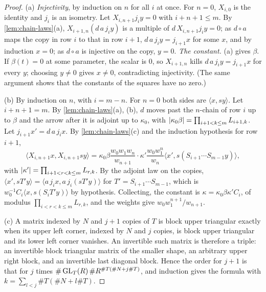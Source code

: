 \begin{proof}
(a) \emph{Injectivity}, by induction on $n$ for all $i$ at once. For $n=0$, $X_{i,0}$ is the identity and $j_i$ is an isometry. Let $X_{i,n+1}j_iy=0$ with $i+n+1\le m$. By \cref{lem:chain-laws}(a),
$X_{i+1,n}(d\,a\,j_iy)$ is a multiple of $d\,X_{i,n+1}j_iy=0$; as $d\circ a$ maps the copy in row $i$ to that in row $i+1$, $d\,a\,j_iy=j_{i+1}x$ for some $x$, and by induction $x=0$; as $d\circ a$ is injective on the copy,
$y=0$. \emph{The constant.} (a) gives $\beta$. If $\beta(t)=0$ at some parameter, the scalar is $0$, so $X_{i+1,n}$ kills $d\,a\,j_iy=j_{i+1}x$ for every $y$; choosing $y\ne0$ gives $x\ne0$, contradicting
injectivity. (The same argument shows that the constants of the squares have no zero.)

(b) By induction on $n$, with $i=m-n$. For $n=0$ both sides are $\langle x,sy\rangle$. Let $i+n+1=m$. By \cref{lem:chain-laws}(a), (b), $d$ moves past the $n$-chain of row $i$ up to $\beta$ and the arrow after it is
adjoint up to $\kappa_0$, with $\lvert \kappa_0\beta\rvert=\prod_{i+1<k\le m}L_{i+1,k}$. Let $j_{i+1}x'=d\,a\,j_ix$. By \cref{lem:chain-laws}(c) and the induction hypothesis for row $i+1$,
\[
  \langle X_{i,n+1}x,X_{i,n+1}sy\rangle=\kappa_0\beta\frac{w_0w_1w_n}{w_{n+1}}\cdot\kappa'\frac{w_0w_1^n}{w_n}\langle x',s(S_{i+1}\cdots S_{m-1}y)\rangle,
\]
with $\lvert \kappa'\rvert=\prod_{i+1<r<k\le m}L_{r,k}$. By the adjoint law on the copies, $\langle x',sT'y\rangle=\langle a\,j_ix,a\,j_i(sT'y)\rangle$ for $T'=S_{i+1}\cdots S_{m-1}$, which is $w_0^{-1}C_i\langle x,s(S_iT'y)\rangle$ by hypothesis.
Collecting, the constant is $\kappa=\kappa_0\beta\kappa'C_i$, of modulus $\prod_{i<r<k\le m}L_{r,k}$, and the weights give $w_0w_1^{n+1}/w_{n+1}$.

(c) A matrix indexed by $N$ and $j+1$ copies of $T$ is block upper triangular exactly when its upper left corner, indexed by $N$ and $j$ copies, is block upper triangular and its lower left corner vanishes.
An invertible such matrix is therefore a triple: an invertible block triangular matrix of the smaller shape, an arbitrary upper right block, and an invertible last diagonal block. Hence the order for $j+1$ is that
for $j$ times $\#\operatorname{GL}_T(R)\,\#R^{\#T(\#N+j\#T)}$, and induction gives the formula with $k=\sum_{l<j}\#T(\#N+l\#T)$.
\end{proof}


